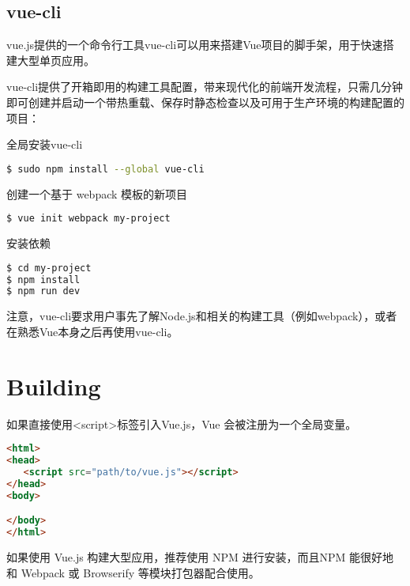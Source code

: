 \subsection{vue-cli}





vue.js提供的一个命令行工具vue-cli可以用来搭建Vue项目的脚手架，用于快速搭建大型单页应用。

vue-cli提供了开箱即用的构建工具配置，带来现代化的前端开发流程，只需几分钟即可创建并启动一个带热重载、保存时静态检查以及可用于生产环境的构建配置的项目：


\begin{compactitem}
\item 全局安装vue-cli

\begin{lstlisting}[language=bash]
$ sudo npm install --global vue-cli
\end{lstlisting}

\item 创建一个基于 webpack 模板的新项目

\begin{lstlisting}[language=bash]
$ vue init webpack my-project
\end{lstlisting}

\item 安装依赖

\begin{lstlisting}[language=bash]
$ cd my-project
$ npm install
$ npm run dev
\end{lstlisting}
\end{compactitem}

注意，vue-cli要求用户事先了解Node.js和相关的构建工具（例如webpack），或者在熟悉Vue本身之后再使用vue-cli。





\section{Building}


如果直接使用<script>标签引入Vue.js，Vue 会被注册为一个全局变量。

\begin{lstlisting}[language=HTML]
<html>
<head>
   <script src="path/to/vue.js"></script>
</head>
<body>

</body>
</html>
\end{lstlisting}



如果使用 Vue.js 构建大型应用，推荐使用 NPM 进行安装，而且NPM 能很好地和 Webpack 或 Browserify 等模块打包器配合使用。

